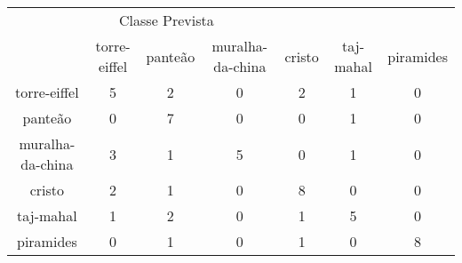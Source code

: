\begin{tabular}{|c|c|c|c|c|c|c|}
\hline
\multicolumn{5}{|c|}{Classe Prevista}\\
 & torre-eiffel & panteão & muralha-da-china & cristo & taj-mahal & piramides\\
torre-eiffel & 5 & 2 & 0 & 2 & 1 & 0\\
panteão & 0 & 7 & 0 & 0 & 1 & 0\\
muralha-da-china & 3 & 1 & 5 & 0 & 1 & 0\\
cristo & 2 & 1 & 0 & 8 & 0 & 0\\
taj-mahal & 1 & 2 & 0 & 1 & 5 & 0\\
piramides & 0 & 1 & 0 & 1 & 0 & 8\\
\end{tabular}
